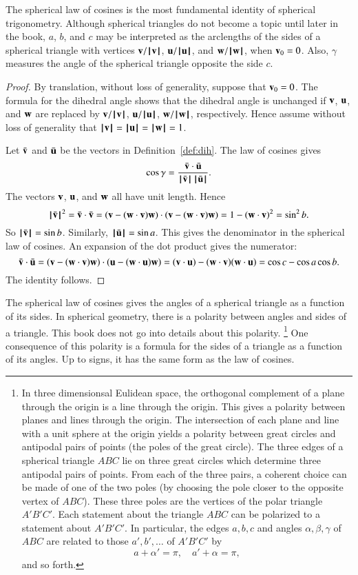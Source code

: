 The spherical law of cosines is the most fundamental identity of spherical trigonometry.    Although  spherical
triangles do not become a topic until later in the book, $a$, $b$, and $c$ may be interpreted as
the arclengths of the sides of a spherical triangle with
vertices $\v/\normo{\v}$, $\u/\normo{\u}$, and $\w/\normo{\w}$,  when $\v_0=0$.  Also,
$\gamma$ measures the angle of the spherical triangle opposite the
side $c$.
%
%


\begin{proof}  By translation, without loss of generality, suppose that $\v_0=0$.  
The formula for the dihedral angle shows that the
dihedral angle is unchanged if $\v$, $\u$, and $\w$ are replaced
by $\v/\normo{\v}$, $\u/\normo{\u}$, $\w/\normo{\w}$, respectively.  Hence assume without
loss of generality that $\normo{\v}=\normo{\u}=\normo{\w}=1$.

Let $\bar \v$ and $\bar \u$ be the vectors in Definition~\ref{def:dih}.
The law of cosines gives
        $$\cos\gamma = \frac{\bar \v\cdot \bar \u}{\normo{\bar \v}\,\normo{\bar \u}}.$$
The vectors $\v$, $\u$, and $\w$ all have unit length.  Hence
        $$
        \normo{\bar \v}^2 = \bar \v\cdot \bar \v =
        (\v - (\w\cdot \v)\w)\cdot (\v - (\w\cdot \v) \w) =
        1 - (\w\cdot \v)^2 = \sin^2 b.
        $$
So $\normo{\bar \v} =\sin b$. Similarly, $\normo{\bar \u} = \sin a$.  This gives
the denominator in the spherical law of cosines.  An expansion of the dot product
gives the numerator:
    $$
    \bar \v\cdot \bar \u = (\v - (\w\cdot \v) \w)\cdot (\u - (\w\cdot \u) \w)
    = (\v\cdot \u) - (\w\cdot \v) (\w\cdot \u) = \cos c - \cos
    a \cos b.
    $$
The identity follows.
\end{proof}

The spherical law of cosines gives the angles of a spherical
triangle as a function of its sides.  In spherical geometry,
there is a polarity between angles and sides of a triangle.
This book does not go into details about this polarity.%
\footnote{In three dimensionsal Eulidean space, the orthogonal
complement of a plane through the origin is a line through
the origin.  This gives a polarity between planes and lines
through the origin.  The intersection of each plane and line with
a unit sphere at the origin yields a polarity between great
circles and antipodal
pairs of points (the poles of the great circle).  The three edges
of a spherical triangle $ABC$ lie on three great circles which
determine three
antipodal pairs of points.  From each of the three  pairs, 
a coherent
choice can be made of one of the two poles (by choosing the pole
closer to the opposite vertex of $ABC$).  
These three poles are the vertices
of the polar triangle $A'B'C'$.  Each statement about the triangle $ABC$
can be polarized to a statement about $A'B'C'$.
In particular, the edges $a,b,c$ and angles $\alpha,\beta,\gamma$ of $ABC$ 
are related to those $a',b',\ldots$ of $A'B'C'$ by
   $$
   a + \alpha' = \pi,\quad a' + \alpha= \pi,
   $$
and so forth.
}  %
One
consequence of this polarity is a formula for the sides of
a triangle as a function of its angles.  Up to signs,
it has the same form as the law of cosines.
%

